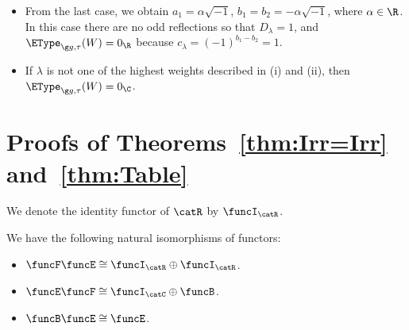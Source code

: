 \documentclass[12pt]{amsart}
\begin{document}
\begin{ex}
\begin{itemize}
\begin{itemize}
\end{itemize}

\item[(ii)] From the last case, we obtain $a_1=\alpha\sqrt{-1}$, $b_1=b_2=-\alpha\sqrt{-1}$, where $\alpha\in\R$. In this case there are no odd reflections so that $D_\lambda=1$, and $\EType_{\g g,\tau}(W)=0_\R$ because $c_\lambda=(-1)^{b_1-b_2}=1$.

\item[(iii)] If $\lambda$ is not one of the highest weights described in (i) and (ii), then $\EType_{\g g,\tau}(W)=0_\C$. 
\end{itemize}




 
\end{ex}




\appendix

\section{Proofs of Theorems~\ref{thm:Irr=Irr} and~\ref{thm:Table}} 
\label{sec:proofsthms}





We denote the identity functor of $\catR$ by $\funcI_\catR$.
\begin{lem}
\label{lem:EFandEF}
We have the following natural isomorphisms of functors:
\begin{itemize}
\item[\rm (i)]
$\funcF\funcE\cong \funcI_\catR\oplus\funcI_\catR$.
\item[\rm (ii)]
$\funcE\funcF\cong \funcI_\catC\oplus\funcB$.
\item[\rm (iii)] $\funcB\funcE\cong \funcE$. 
\end{itemize}
\end{lem}
\end{document}
